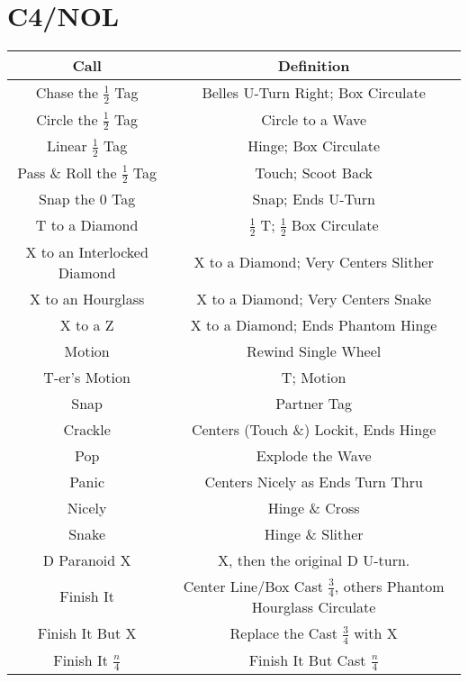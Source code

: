 \documentclass{article}
\begin{document}
\section*{C4/NOL}

\begin{center}
  \begin{tabular}{c | c}
    Call & Definition \\ \hline
    Chase the $\frac12$ Tag & Belles U-Turn Right; Box Circulate \\
    Circle the $\frac12$ Tag & Circle to a Wave \\
    Linear $\frac12$ Tag & Hinge; Box Circulate \\
    Pass \& Roll the $\frac12$ Tag & Touch; Scoot Back \\
    Snap the 0 Tag & Snap; Ends U-Turn \\
    T to a Diamond & $\frac12$ T; $\frac12$ Box Circulate \\
    X to an Interlocked Diamond & X to a Diamond; Very Centers Slither \\
    X to an Hourglass & X to a Diamond; Very Centers Snake \\
    X to a Z & X to a Diamond; Ends Phantom Hinge \\
    Motion & Rewind Single Wheel \\
    T-er's Motion & T; Motion \\
    Snap & Partner Tag \\
    Crackle & Centers (Touch \&) Lockit, Ends Hinge \\
    Pop & Explode the Wave \\
    Panic & Centers Nicely as Ends Turn Thru \\
    Nicely & Hinge \& Cross \\
    Snake & Hinge \& Slither \\
    D Paranoid X & X, then the original D U-turn. \\
    Finish It & Center Line/Box Cast $\frac34$, others Phantom Hourglass Circulate \\
    Finish It But X & Replace the Cast $\frac34$ with X \\
    Finish It $\frac{n}{4}$ & Finish It But Cast $\frac{n}{4}$ \\
  \end{tabular}
\end{center}
\end{document}
